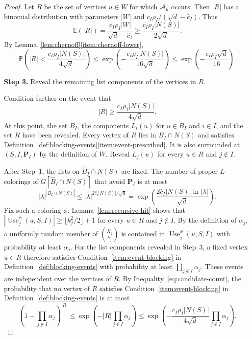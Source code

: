 \documentclass[10pt,a4paper]{amsart}
\numberwithin{equation}{section}
\newcommand{\Prob}{\mathbb{P}}
\newcommand{\Ex}{\mathbb{E}}
\newcommand{\Use}{\operatorname{Use}}
\begin{document}
\begin{proof}
Let $R$ be the set of vertices $u\in W$ for which $\mathcal A_u$ occurs.
Then $|R|$ has a binomial distribution with parameters $|W|$ and
$c_I\rho_I/(\sqrt d-\hat c_I)$. Thus
\[
\Ex(|R|)
=\frac{c_I\rho_I|W|}{\sqrt d-\hat c_I}
\geq\frac{c_I\rho_I|N(S)|}{2\sqrt d}.
\]
By Lemma~\ref{lem:chernoff}\ref{item:chernoff-lower},
\begin{equation}\label{eq:candidate-tail}
 \Prob\left(
 |R| < \frac{c_I\rho_I|N(S)|}{4\sqrt{d}}
 \right)
 \leq \exp\left(-\frac{c_I\rho_I|N(S)|}{16\sqrt{d}}\right)
 \leq \exp\left(-\frac{c_I\rho_I\sqrt{d}}{16}\right).
\end{equation}

\medskip
\noindent
\textbf{Step 3.} Reveal the remaining list components of the vertices in $R$.
\par\nobreak
\medskip

Condition further on the event that
\begin{equation}\label{eq:candidate-count}
 |R| \geq \frac{c_I\rho_I|N(S)|}{4\sqrt{d}}.
\end{equation}
At this point, the set $B_I$, the components $L_i(u)$ for $u\in B_I$ and
$i\in I$, and the set $R$ have been revealed.
Every vertex of $R$ lies in $B_I \cap N(S)$ and satisfies
Definition~\ref{def:blocking-events}\ref{item:event-prescribed}. It is also
surrounded at $(S,I,\mathbf{P}_I)$ by the definition of $W$. Reveal
$L_j(u)$ for every $u \in R$ and $j \notin I$.

After Step~1, the lists on $\hat{B}_{I} \cap N(S)$ are fixed. The number of
proper $L$-colorings of
$G[\hat{B}_{I} \cap N(S)]$ that avoid $\mathbf{P}_I$ is at most
\begin{equation}\label{eq:number-upper-colorings}
 |\lambda|^{|\hat{B}_{I} \cap N(S)|}
 \leq |\lambda|^{2\hat{c}_{I}|N(S)|/\sqrt{d}}
 = \exp\left(
 \frac{2\hat{c}_{I}|N(S)|\ln |\lambda|}{\sqrt{d}}
 \right).
\end{equation}
Fix such a coloring $\phi$. Lemma~\ref{lem:recursive-hit} shows that
$|\Use_j^\phi(u,S,I)|\geq\lfloor k_j^2/2\rfloor+1$ for every $u\in R$ and
$j\notin I$. By
the definition of $\alpha_j$, a uniformly random member of
$\binom{X_j}{k_j}$ is contained in $\Use_j^\phi(u, S, I)$ with probability
at least $\alpha_j$. For the list components revealed in Step~3, a fixed
vertex $u \in R$ therefore satisfies Condition~\ref{item:event-blocking} in
Definition~\ref{def:blocking-events} with probability at least
$\prod_{j \notin I}\alpha_j$. These events are independent over the vertices
of $R$. By Inequality~\eqref{eq:candidate-count}, the probability that no vertex of $R$
satisfies Condition~\ref{item:event-blocking} in
Definition~\ref{def:blocking-events} is at most
\[
 \left(1 - \prod_{j \notin I}\alpha_j\right)^{|R|}
 \leq \exp\left(-|R|\prod_{j \notin I}\alpha_j\right)
 \leq \exp\left(
 -\frac{c_I\rho_I|N(S)|}{4\sqrt{d}}
 \prod_{j \notin I}\alpha_j
 \right).
\]


\end{proof}
\end{document}
